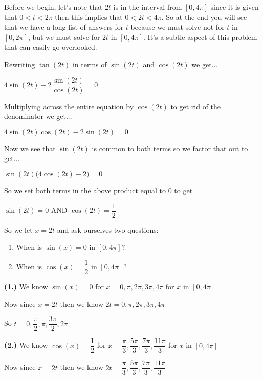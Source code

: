 \documentclass[12pt]{article}
\begin{document}
Before we begin, let's note that $2t$ is in the interval from $[0, 4\pi]$ since it is given that $0 <t < 2\pi$ then this implies that $0<2t<4\pi$. So at the end you will see that we have a long list of answers for $t$ because we must solve not for $t$ in $[0, 2\pi]$, but we must solve for $2t$ in $[0, 4\pi]$. It's a subtle aspect of this problem that can easily go overlooked.

Rewriting $\tan(2t)$ in terms of $\sin(2t)$ and $\cos(2t)$ we get...
\newline

\centerline{$4\sin(2t) - 2\dfrac{\sin(2t)}{\cos(2t)} = 0$}

Multiplying across the entire equation by $\cos(2t)$ to get rid of the denominator we get...
\newline

\centerline{$4\sin(2t)\cos(2t) - 2\sin(2t) = 0$}

Now we see that $\sin(2t)$ is common to both terms so we factor that out to get...
\newline

\centerline{$\sin(2t)\Big(4\cos(2t) - 2\Big) = 0$}

So we set both terms in the above product equal to $0$ to get
\newline

\centerline{$\sin(2t) = 0$ \hspace{1cm} AND \hspace{1cm} $\cos(2t) = \dfrac{1}{2}$}

So we let $x = 2t$ and ask ourselves two questions:
\begin{enumerate}
\item When is $\sin(x) = 0$ in $[0, 4\pi]$?
\item When is $\cos(x) = \dfrac{1}{2}$ in $[0, 4\pi]$?
\end{enumerate}

\textbf{(1.)} We know $\sin(x) = 0$ for $x = 0, \pi, 2\pi, 3\pi, 4\pi$ for $x$ in $[0, 4\pi]$

Now since $x = 2t$ then we know $2t = 0, \pi, 2\pi, 3\pi, 4\pi$

So $t = 0, \dfrac{\pi}{2}, \pi, \dfrac{3\pi}{2}, 2\pi$

\textbf{(2.)} We know $\cos(x) = \dfrac{1}{2}$ for $x = \dfrac{\pi}{3}, \dfrac{5\pi}{3}, \dfrac{7\pi}{3}, \dfrac{11\pi}{3}$ for  $x$ in $[0, 4\pi]$

Now since $x = 2t$ then we know $2t =  \dfrac{\pi}{3}, \dfrac{5\pi}{3}, \dfrac{7\pi}{3}, \dfrac{11\pi}{3}$
\end{document}
